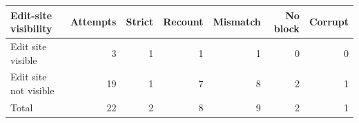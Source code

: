 \begin{tabular}{lrrrrrr}
\toprule
Edit-site visibility & Attempts & Strict & Recount & Mismatch & No block & Corrupt \\
\midrule
Edit site visible & 3 & 1 & 1 & 1 & 0 & 0 \\
Edit site not visible & 19 & 1 & 7 & 8 & 2 & 1 \\
Total & 22 & 2 & 8 & 9 & 2 & 1 \\
\bottomrule
\end{tabular}
